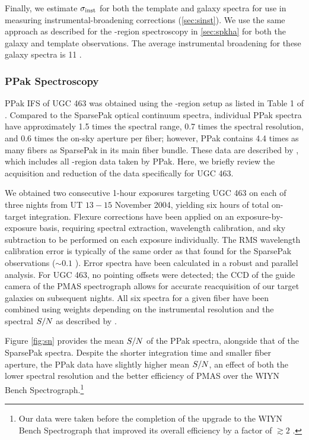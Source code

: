 \documentclass[apj,iop,numberedappendix]{emulateapj}
\begin{document}
Finally, we estimate $\sigma_{\rm inst}$ for both the template and galaxy spectra for use
in measuring instrumental-broadening corrections (\sect \ref{sec:sinst}).  We
use the same approach as described for the \halp-region spectroscopy in \sect
\ref{sec:spkha} for both the galaxy and template observations.  The average
instrumental broadening for these galaxy spectra is 11 \kms.

\subsubsection{PPak Spectroscopy}
\label{sec:ppkstar}

PPak IFS of UGC 463 was obtained using the \mgi-region setup as listed in Table
1 of .  Compared to the SparsePak optical
continuum spectra, individual PPak spectra have approximately 1.5 times the
spectral range, 0.7 times the spectral resolution, and 0.6 times the on-sky
aperture per fiber; however, PPak contains 4.4 times as many fibers as SparsePak
in its main fiber bundle.  These data are described by \citet{TPKMPhD}, which
includes all \mgi-region data taken by PPak.  Here, we briefly review the
acquisition and reduction of the data specifically for UGC 463.

We obtained two consecutive 1-hour exposures targeting UGC 463 on each of three
nights from UT $13-15$ November 2004, yielding six hours of total on-target
integration.  Flexure corrections have been applied on an exposure-by-exposure
basis, requiring spectral extraction, wavelength calibration, and sky
subtraction to be performed on each exposure individually. The RMS wavelength
calibration error is typically of the same order as that found for the SparsePak
observations ($\sim0.1$ \kms).  Error spectra have been calculated in a robust
and parallel analysis.  For UGC 463, no pointing offsets were detected; the CCD
of the guide camera of the PMAS spectrograph allows for accurate reacquisition
of our target galaxies on subsequent nights.  All six spectra for a given fiber
have been combined using weights depending on the instrumental resolution and
the spectral $S/N$ as described by \citet{TPKMPhD}.  

Figure \ref{fig:sn} provides the mean $S/N$ of the PPak spectra, alongside
that of the SparsePak spectra.  Despite the shorter integration time and smaller
fiber aperture, the PPak data have slightly higher mean $S/N$, an effect of both
the lower spectral resolution and the better efficiency of PMAS over the WIYN
Bench Spectrograph.\footnote{
%
Our data were taken before the completion of the upgrade to the WIYN Bench
Spectrograph that improved its overall efficiency by a factor of $\gtrsim 2$
\citep{2008SPIE.7014E..15B, 2010SPIE.7735E.240K}.
%
}
\end{document}
